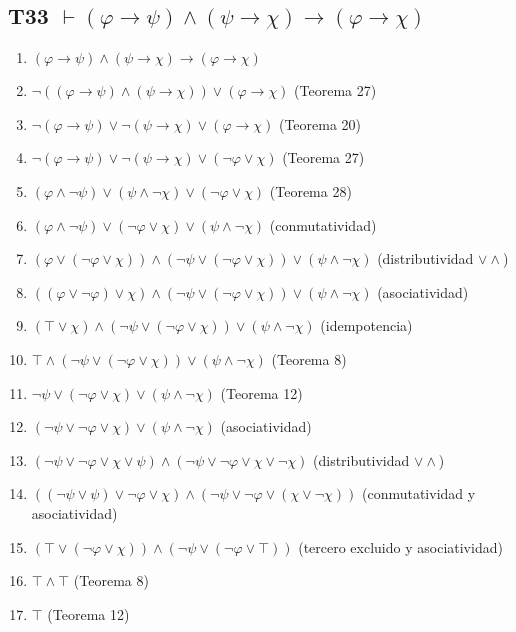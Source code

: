 \documentclass[a4paper,11pt]{article}
\begin{document}
\subsection{T33 $\vdash (\varphi \rightarrow \psi) \land (\psi \rightarrow \chi) \rightarrow (\varphi \rightarrow \chi)$}

\begin{enumerate}
    \item $(\varphi \rightarrow \psi) \land (\psi \rightarrow \chi) \rightarrow (\varphi \rightarrow \chi)$
    \item $\neg((\varphi \rightarrow \psi) \land (\psi \rightarrow \chi)) \lor (\varphi \rightarrow \chi)$ \hfill (Teorema 27)
    \item $\neg(\varphi \rightarrow \psi) \lor \neg(\psi \rightarrow \chi) \lor (\varphi \rightarrow \chi)$ \hfill (Teorema 20)
    \item $\neg(\varphi \rightarrow \psi) \lor \neg(\psi \rightarrow \chi) \lor (\neg\varphi \lor \chi)$ \hfill (Teorema 27)
    \item $(\varphi \land \neg\psi) \lor (\psi \land \neg\chi) \lor (\neg\varphi \lor \chi)$ \hfill (Teorema 28)
    \item $(\varphi \land \neg\psi) \lor (\neg\varphi \lor \chi) \lor (\psi \land \neg\chi)$ \hfill (conmutatividad)
    \item $(\varphi \lor (\neg\varphi \lor \chi)) \land (\neg\psi \lor (\neg\varphi \lor \chi)) \lor (\psi \land \neg\chi)$ \hfill (distributividad $\lor\land$)
    \item $((\varphi \lor \neg\varphi) \lor \chi) \land (\neg\psi \lor (\neg\varphi \lor \chi)) \lor (\psi \land \neg\chi)$ \hfill (asociatividad)
    \item $(\top \lor \chi) \land (\neg\psi \lor (\neg\varphi \lor \chi)) \lor (\psi \land \neg\chi)$ \hfill (idempotencia)
    \item $\top \land (\neg\psi \lor (\neg\varphi \lor \chi)) \lor (\psi \land \neg\chi)$ \hfill (Teorema 8)
    \item $\neg\psi \lor (\neg\varphi \lor \chi) \lor (\psi \land \neg\chi)$ \hfill (Teorema 12)
    \item $(\neg\psi \lor \neg\varphi \lor \chi) \lor (\psi \land \neg\chi)$ \hfill (asociatividad)
    \item $(\neg\psi \lor \neg\varphi \lor \chi \lor \psi) \land (\neg\psi \lor \neg\varphi \lor \chi \lor \neg\chi)$ \hfill (distributividad $\lor\land$)
    \item $((\neg\psi \lor \psi) \lor \neg\varphi \lor \chi) \land (\neg\psi \lor \neg\varphi \lor (\chi \lor \neg\chi))$ \hfill (conmutatividad y asociatividad)
    \item $(\top \lor (\neg\varphi \lor \chi)) \land (\neg\psi \lor (\neg\varphi \lor \top))$ \hfill (tercero excluido y asociatividad)
    \item $\top \land \top$ \hfill (Teorema 8)
    \item $\top$ \hfill (Teorema 12)
\end{enumerate}
\end{document}
